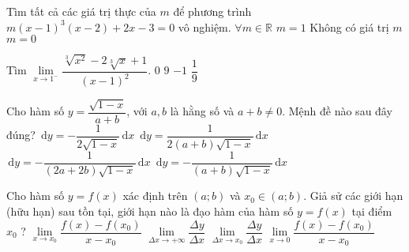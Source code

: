 \begin{ex}%
    Tìm tất cả các giá trị thực của $m$ để phương trình $m(x-1)^3(x-2)+2x-3=0$ vô nghiệm.
    \choice
    {$\forall m\in \mathbb{R}$}
    {$m=1$}
    {\True Không có giá trị $m$}
    {$m=0$}
\end{ex}
\begin{ex}%
    Tìm $\lim\limits_{x\to 1^-} \dfrac{\sqrt[3]{x^2}-2\sqrt[3]{x}+1}{(x-1)^2}$.
    \choice
    {$0$}
    {$9$}
    {$-1$}
    {\True $\dfrac{1}{9}$}
\end{ex}
\begin{ex}%
    Cho hàm số $y=\dfrac{\sqrt{1-x}}{a+b}$, với $a,b$ là hằng số và $a+b\ne 0$. Mệnh đề nào sau đây đúng?
    \choice
    {$\mathrm{\,d}y=-\dfrac{1}{2\sqrt{1-x}} \mathrm{\,d}x$}
    {$\mathrm{\,d}y=\dfrac{1}{2(a+b)\sqrt{1-x}} \mathrm{\,d}x$}
    {\True $\mathrm{\,d}y=-\dfrac{1}{(2a+2b)\sqrt{1-x}} \mathrm{\,d}x$}
    {$\mathrm{\,d}y=-\dfrac{1}{(a+b)\sqrt{1-x}} \mathrm{\,d}x$}
\end{ex}
\begin{ex}%
    Cho hàm số $y=f(x)$ xác định trên $(a;b)$ và $x_0\in (a;b)$. Giả sử các giới hạn (hữu hạn) sau tồn tại, giới hạn nào là đạo hàm của hàm số $y=f(x)$ tại điểm $x_0$ ?
    \choice
    {\True $\lim\limits_{x\to x_0} \dfrac{f(x)-f(x_0)}{x-x_0}$}
    {$\lim\limits_{\Delta x\to +\infty} \dfrac{\Delta y}{\Delta x}$}
    {$\lim\limits_{\Delta x\to x_0} \dfrac{\Delta y}{\Delta x}$}
    {$\lim\limits_{x\to 0} \dfrac{f(x)-f(x_0)}{x-x_0}$}
\end{ex}
